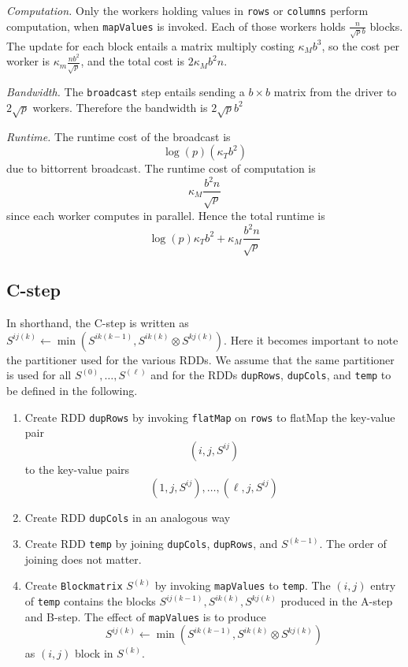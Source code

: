 \documentclass{article} %
\begin{document}
\emph{Computation.}  Only the workers holding values in {\tt rows} or
     {\tt columns} perform computation, when {\tt mapValues} is
     invoked.  Each of those workers holds $\frac{n}{\sqrt{p}b}$
     blocks.  The update for each block entails a matrix multiply
     costing $\kappa_M b^3$, so the cost per worker is $\kappa_m
     \frac{nb^2}{\sqrt{p}}$, and the total cost is $2\kappa_M b^2 n$.

\emph{Bandwidth.} The {\tt broadcast} step entails sending a $b \times
b$ matrix from the driver to $2\sqrt{p}$ workers.  Therefore the
bandwidth is $2\sqrt{p}b^2$

\emph{Runtime.} The runtime cost of the broadcast is
\[
\log(p)(\kappa_T b^2)
\]
due to bittorrent broadcast.
The runtime cost of computation is
\[
\kappa_M \frac{b^2 n}{\sqrt{p}}
\]
since each worker computes in parallel.
Hence the total runtime is
\[
\log(p)\kappa_T b^2 + \kappa_M \frac{b^2 n}{\sqrt{p}}
\]

\subsection{C-step}

In shorthand, the C-step is written as $S^{ij(k)} \leftarrow \min(S^{ik(k-1)}, S^{ik(k)} \otimes S^{kj(k)})$.
Here it becomes important to note the partitioner used for the various RDDs.
We assume that the same partitioner is used for all $S^{(0)}, \hdots, S^{(\ell)}$
and for the RDDs {\tt dupRows}, {\tt dupCols}, and {\tt temp} to be defined in the following.

\begin{enumerate}
\item Create RDD {\tt dupRows} by invoking {\tt flatMap} on {\tt rows} to flatMap the key-value pair
\[
(i, j, S^{ij})
\]
to the key-value pairs
\[
(1, j, S^{ij}), \hdots, (\ell, j, S^{ij})
\]
\item Create RDD {\tt dupCols} in an analogous way
\item Create RDD {\tt temp} by joining {\tt dupCols}, {\tt dupRows},
  and $S^{(k-1)}$.  The order of joining does not matter.
\item Create {\tt Blockmatrix} $S^{(k)}$ by invoking {\tt mapValues}
  to {\tt temp}.  The $(i, j)$ entry of {\tt temp} contains the blocks
  $S^{ij(k-1)}, S^{ik(k)}, S^{kj(k)}$ produced in the A-step and
  B-step.  The effect of {\tt mapValues} is to produce
\[
S^{ij(k)} \leftarrow \min(S^{ik(k-1)}, S^{ik(k)} \otimes S^{kj(k)})
\]
as $(i, j)$ block in $S^{(k)}$.
\end{enumerate}
\end{document}
